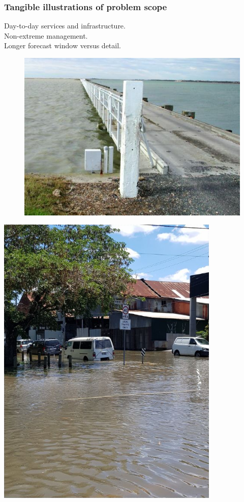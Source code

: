 \begin{frame}
\frametitle{Tangible illustrations of problem scope}
Day-to-day services and infrastructure.\\
Non-extreme management.\\
Longer forecast window versus detail.\\
\begin{minipage}{0.4\textwidth}
    \begin{figure}      
    \includegraphics[height=0.4\textheight]{figures/images/goolwa_ewe_island-environment_sa_gov_au.jpg}
    \end{figure}
\end{minipage}
\hfill
\begin{minipage}{0.4\textwidth}
    \centering
     \includegraphics[width=0.8\textwidth]{figures/images/sunnyFlood_ClarkJan2018Brisbane.png} 
\end{minipage}

\end{frame}
